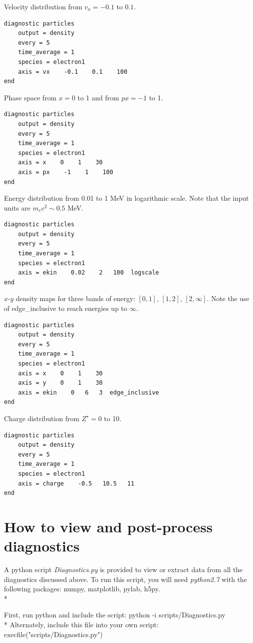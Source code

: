 \documentclass[11pt]{article}
\newcommand{\code}[1]{\colorbox{yellow!15}{\ttfamily #1}}
\begin{document}
Velocity distribution from $v_x = -0.1$ to $0.1$.
\begin{lstlisting}
diagnostic particles
	output = density
	every = 5
	time_average = 1
	species = electron1
	axis = vx    -0.1    0.1    100
end
\end{lstlisting}

Phase space from $x=0$ to 1 and from $px=-1$ to 1.
\begin{lstlisting}
diagnostic particles
	output = density
	every = 5
	time_average = 1
	species = electron1
	axis = x    0    1    30
	axis = px    -1    1    100
end
\end{lstlisting}

Energy distribution from 0.01 to 1 MeV in logarithmic scale.
Note that the input units are $m_ec^2 \sim 0.5$ MeV.
\begin{lstlisting}
diagnostic particles
	output = density
	every = 5
	time_average = 1
	species = electron1
	axis = ekin    0.02    2   100  logscale
end
\end{lstlisting}
\clearpage

$x$-$y$ density maps for three bands of energy: $[0,1]$, $[1,2]$, $[2,\infty]$.
Note the use of \code{edge\_inclusive} to reach energies up to $\infty$.
\begin{lstlisting}
diagnostic particles
	output = density
	every = 5
	time_average = 1
	species = electron1
	axis = x    0    1    30
	axis = y    0    1    30
	axis = ekin    0   6   3  edge_inclusive
end
\end{lstlisting}

Charge distribution from $Z^\star =0$ to 10.
\begin{lstlisting}
diagnostic particles
	output = density
	every = 5
	time_average = 1
	species = electron1
	axis = charge    -0.5   10.5   11
end
\end{lstlisting}


\clearpage


\section{How to view and post-process diagnostics}

A python script \textit{Diagnostics.py} is provided to view or extract data from all the diagnostics discussed above.
To run this script, you will need \textit{python2.7} with the following packages: numpy, matplotlib, pylab, h5py.
\\*

First, run python and include the script: \code{python -i scripts/Diagnostics.py}\\*
Alternately, include this file into your own script: \code{execfile("scripts/Diagnostics.py")}
\vspace{0.5cm}
\end{document}

